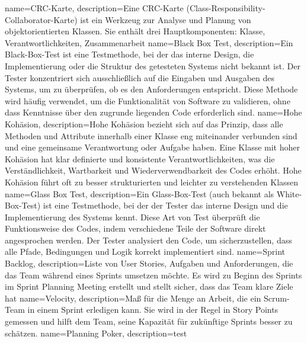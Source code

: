 {
    name={CRC-Karte},
    description={Eine CRC-Karte (Class-Responsibility-Collaborator-Karte) ist ein Werkzeug zur Analyse und Planung von objektorientierten Klassen. Sie enthält drei Hauptkomponenten: Klasse, Verantwortlichkeiten, Zusammenarbeit}
}
{
    name={Black Box Test},
    description={Ein Black-Box-Test ist eine Testmethode, bei der das interne Design, die Implementierung oder die Struktur des getesteten Systems nicht bekannt ist. Der Tester konzentriert sich ausschließlich auf die Eingaben und Ausgaben des Systems, um zu überprüfen, ob es den Anforderungen entspricht. Diese Methode wird häufig verwendet, um die Funktionalität von Software zu validieren, ohne dass Kenntnisse über den zugrunde liegenden Code erforderlich sind.}
}
{
    name={Hohe Kohäsion},
    description={Hohe Kohäsion bezieht sich auf das Prinzip, dass alle Methoden und Attribute innerhalb einer Klasse eng miteinander verbunden sind und eine gemeinsame Verantwortung oder Aufgabe haben. Eine Klasse mit hoher Kohäsion hat klar definierte und konsistente Verantwortlichkeiten, was die Verständlichkeit, Wartbarkeit und Wiederverwendbarkeit des Codes erhöht. Hohe Kohäsion führt oft zu besser strukturierten und leichter zu verstehenden Klassen}
}
{
    name={Glass Box Test},
    description={Ein Glass-Box-Test (auch bekannt als White-Box-Test) ist eine Testmethode, bei der der Tester das interne Design und die Implementierung des Systems kennt. Diese Art von Test überprüft die Funktionsweise des Codes, indem verschiedene Teile der Software direkt angesprochen werden. Der Tester analysiert den Code, um sicherzustellen, dass alle Pfade, Bedingungen und Logik korrekt implementiert sind.}
}
{
    name={Sprint Backlog},
    description={Liste von User Stories, Aufgaben und Anforderungen, die das Team während eines Sprints umsetzen möchte. Es wird zu Beginn des Sprints im Sprint Planning Meeting erstellt und stellt sicher, dass das Team klare Ziele hat}
}
{
    name={Velocity},
    description={Maß für die Menge an Arbeit, die ein Scrum-Team in einem Sprint erledigen kann. Sie wird in der Regel in Story Points gemessen und hilft dem Team, seine Kapazität für zukünftige Sprints besser zu schätzen.}
}
{
    name={Planning Poker},
    description={test}
}
